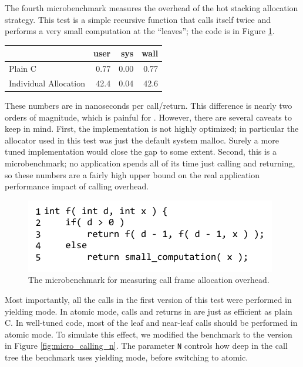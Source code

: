 \documentclass[9pt,preprint]{sigplanconf}
\begin{document}
The fourth microbenchmark measures the overhead of the hot stacking allocation strategy.
This test is a simple recursive function that calls itself twice and performs a very small computation at the ``leaves''; the code is in Figure \ref{fig:micro_calling}.

\vspace{1em}
\begin{tabular}{|l|r|r|r|}
  \hline
   & user & sys & wall \\
  \hline
  \hline
  Plain C & 0.77 & 0.00 & 0.77 \\
  \hline
  Individual Allocation & 42.4 & 0.04 & 42.6 \\
  \hline
\end{tabular}
\vspace{1em}

These numbers are in nanoseconds per call/return.
This difference is nearly two orders of magnitude, which is painful for \charcoal{}.
However, there are several caveats to keep in mind.
First, the \charcoal{} implementation is not highly optimized; in particular the allocator used in this test was just the default system malloc.
Surely a more tuned implementation would close the gap to some extent.
Second, this is a microbenchmark; no application spends all of its time just calling and returning, so these numbers are a fairly high upper bound on the real application performance impact of calling overhead.

\begin{figure}
\includegraphics{just_calling_benchmark}
\caption{The microbenchmark for measuring call frame allocation overhead.}
\label{fig:micro_calling}
\end{figure}

Most importantly, all the calls in the first version of this test were performed in yielding mode.
In atomic mode, calls and returns in \charcoal{} are just as efficient as plain C.
In well-tuned \charcoal{} code, most of the leaf and near-leaf calls should be performed in atomic mode.
To simulate this effect, we modified the benchmark to the version in Figure \ref{fig:micro_calling_n}.
The parameter \texttt{N} controls how deep in the call tree the benchmark uses yielding mode, before switching to atomic.
\end{document}
